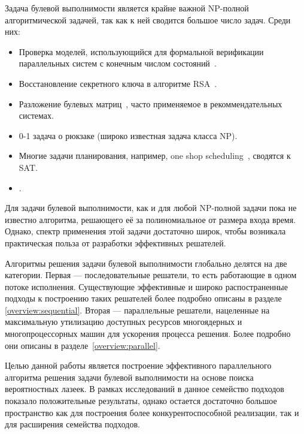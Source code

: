 \label{introduction}
\startprefacepage

Задача булевой выполнимости является крайне важной NP-полной~\cite{bib:cook-levin} алгоритмической
задачей, так как к ней сводится большое число задач. Среди них:
\begin{itemize}
    \item Проверка моделей, использующийся для формальной верификации параллельных систем с
        конечным числом состояний~\cite{bib:use-mc}.
    \item Восстановление секретного ключа в алгоритме RSA~\cite{bib:use-rsa}.
    \item Разложение булевых матриц~\cite{bib:use-bma}, часто применяемое в рекоммендательных
        системах.
    \item 0-1 задача о рюкзаке (широко известная задача класса NP).
    \item Многие задачи планирования, например, one shop scheduling~\cite{bib:use-ojs}, сводятся к SAT.
    \item {}.
\end{itemize}

Для задачи булевой выполнимости, как и для любой NP-полной задачи пока не известно алгоритма,
решающего её за полиномиальное от размера входа время. Однако, спектр применения этой задачи
достаточно широк, чтобы возникала практическая польза от разработки эффективных решателей.

Алгоритмы решения задачи булевой выполнимости глобально делятся на две категории. Первая ---
последовательные решатели, то есть работающие в одном потоке исполнения. Существующие эффективные
и широко распостраненные подходы к построению таких решателей более подробно описаны в разделе~
\ref{overview:sequential}. Вторая --- параллельные решатели, нацеленные на максимальную утилизацию доступных
ресурсов многоядерных и многопроцессорных машин для ускорения процесса решения. Более подробно
они описаны в разделе~\ref{overview:parallel}.

Целью данной работы является построение эффективного параллельного алгоритма решения задачи булевой
выполнимости на основе поиска вероятностных лазеек. В рамках исследований в  данное семейство
подходов показало положительные результаты, однако остается достаточно большое пространство как для
построения более конкурентоспособной реализации, так и для расширения семейства подходов.


